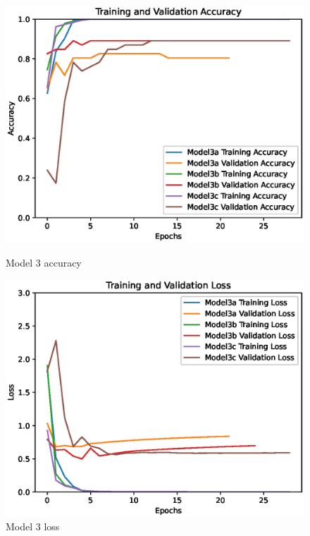 \begin{figure}[H]
    \centering
    \begin{minipage}{0.49\textwidth}
        \centering
        \includegraphics[width=\textwidth]{./fig/model3/accuracy33.eps}
        \caption{Model 3 accuracy}
        \label{fig:model33_acc}
    \end{minipage}
    \begin{minipage}{0.49\textwidth}
        \centering
        \includegraphics[width=\textwidth]{./fig/model3/loss33.eps}
        \caption{Model 3 loss}
        \label{fig:model33_loss}
    \end{minipage}
\end{figure}

